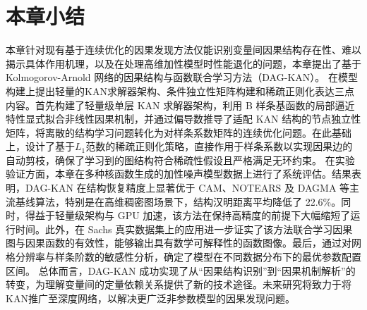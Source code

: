 \section{本章小结}
本章针对现有基于连续优化的因果发现方法仅能识别变量间因果结构存在性、难以揭示具体作用机理，以及在处理高维加性模型时性能退化的问题，本章提出了基于 Kolmogorov-Arnold 网络的因果结构与函数联合学习方法（DAG-KAN）。
在模型构建上提出轻量的KAN求解器架构、条件独立性矩阵构建和稀疏正则化表达三点内容。首先构建了轻量级单层 KAN 求解器架构，利用 B 样条基函数的局部逼近特性显式拟合非线性因果机制，并通过偏导数推导了适配 KAN 结构的节点独立性矩阵，将离散的结构学习问题转化为对样条系数矩阵的连续优化问题。在此基础上，设计了基于$L_1$范数的稀疏正则化策略，直接作用于样条系数以实现因果边的自动剪枝，确保了学习到的图结构符合稀疏性假设且严格满足无环约束。
在实验验证方面，本章在多种核函数生成的加性噪声模型数据上进行了系统评估。结果表明，DAG-KAN 在结构恢复精度上显著优于 CAM、NOTEARS 及 DAGMA 等主流基线算法，特别是在高维稠密图场景下，结构汉明距离平均降低了 22.6\%。同时，得益于轻量级架构与 GPU 加速，该方法在保持高精度的前提下大幅缩短了运行时间。此外，在 Sachs 真实数据集上的应用进一步证实了该方法联合学习因果图与因果函数的有效性，能够输出具有数学可解释性的函数图像。最后，通过对网格分辨率与样条阶数的敏感性分析，确定了模型在不同数据分布下的最优参数配置区间。
总体而言，DAG-KAN 成功实现了从“因果结构识别”到“因果机制解析”的转变，为理解变量间的定量依赖关系提供了新的技术途径。未来研究将致力于将KAN推广至深度网络，以解决更广泛非参数模型的因果发现问题。